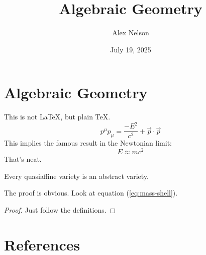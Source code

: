 \documentclass{book}
\title{Algebraic Geometry}
\author{Alex Nelson}
\date{July 19, 2025}
\begin{document}
\frontmatter
\maketitle



\tableofcontents

\mainmatter















\chapter{Algebraic Geometry}

This is not \LaTeX, but plain \TeX.
\begin{equation}\label{eq:mass-shell}
p^{\mu}p_{\mu} = \frac{-E^{2}}{c^{2}}+\vec{p}\cdot\vec{p}
\end{equation}
This implies the famous result in the Newtonian limit:
\begin{equation*}
E \approx mc^{2}
\end{equation*}
That's neat.

\begin{theorem}
Every quasiaffine variety is an abstract variety.
\end{theorem}

The proof is obvious. Look at equation (\ref{eq:mass-shell}).

\begin{proof}
  Just follow the definitions.
\end{proof}




\chapter*{References}



\end{document}
